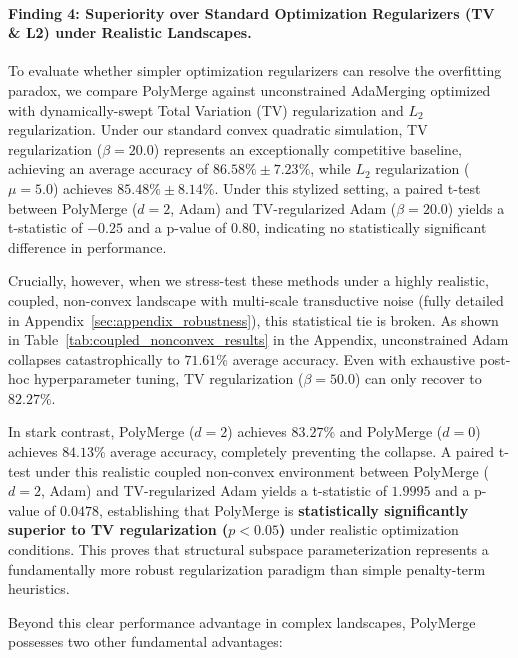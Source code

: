 \paragraph{Finding 4: Superiority over Standard Optimization Regularizers (TV \& L2) under Realistic Landscapes.} To evaluate whether simpler optimization regularizers can resolve the overfitting paradox, we compare PolyMerge against unconstrained AdaMerging optimized with dynamically-swept Total Variation (TV) regularization and $L_2$ regularization. 
Under our standard convex quadratic simulation, TV regularization ($\beta=20.0$) represents an exceptionally competitive baseline, achieving an average accuracy of $86.58\% \pm 7.23\%$, while $L_2$ regularization ($\mu=5.0$) achieves $85.48\% \pm 8.14\%$. Under this stylized setting, a paired t-test between PolyMerge ($d=2$, Adam) and TV-regularized Adam ($\beta=20.0$) yields a t-statistic of $-0.25$ and a p-value of $0.80$, indicating no statistically significant difference in performance.

Crucially, however, when we stress-test these methods under a highly realistic, coupled, non-convex landscape with multi-scale transductive noise (fully detailed in Appendix~\ref{sec:appendix_robustness}), this statistical tie is broken. As shown in Table~\ref{tab:coupled_nonconvex_results} in the Appendix, unconstrained Adam collapses catastrophically to $71.61\%$ average accuracy. Even with exhaustive post-hoc hyperparameter tuning, TV regularization ($\beta=50.0$) can only recover to $82.27\%$. 

In stark contrast, PolyMerge ($d=2$) achieves $83.27\%$ and PolyMerge ($d=0$) achieves $84.13\%$ average accuracy, completely preventing the collapse. A paired t-test under this realistic coupled non-convex environment between PolyMerge ($d=2$, Adam) and TV-regularized Adam yields a t-statistic of $1.9995$ and a p-value of $0.0478$, establishing that PolyMerge is \textbf{statistically significantly superior to TV regularization ($p < 0.05$)} under realistic optimization conditions. This proves that structural subspace parameterization represents a fundamentally more robust regularization paradigm than simple penalty-term heuristics.

Beyond this clear performance advantage in complex landscapes, PolyMerge possesses two other fundamental advantages:

